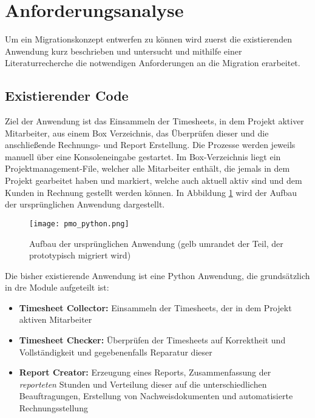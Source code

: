 \section{Anforderungsanalyse}


Um ein Migrationskonzept entwerfen zu können wird zuerst die existierenden Anwendung kurz beschrieben und untersucht und mithilfe einer Literaturrecherche die notwendigen Anforderungen an die Migration erarbeitet.

\subsection{Existierender Code}
Ziel der Anwendung ist das Einsammeln der Timesheets, in dem Projekt aktiver Mitarbeiter, aus einem \gls{Box} Verzeichnis, das Überprüfen dieser und die anschließende Rechnungs- und Report Erstellung. Die Prozesse werden jeweils manuell über eine Konsoleneingabe gestartet. Im \gls{Box}-Verzeichnis liegt ein Projektmanagement-File, welcher alle Mitarbeiter enthält, die jemals in dem Projekt gearbeitet haben und markiert, welche auch aktuell aktiv sind und dem Kunden in Rechnung gestellt werden können. In Abbildung \ref{fig:pmo_python} wird der Aufbau der ursprünglichen Anwendung dargestellt.

\begin{figure}[H]
    \centering
    \texttt{[image: pmo\_python.png]}
    \caption{Aufbau der ursprünglichen Anwendung (gelb umrandet der Teil, der prototypisch migriert wird)}
    \label{fig:pmo_python}
\end{figure}

Die bisher existierende Anwendung ist eine Python Anwendung, die grundsätzlich in dre Module aufgeteilt ist:
\begin{itemize}
\item \textbf{Timesheet Collector: }Einsammeln der Timesheets, der in dem Projekt aktiven Mitarbeiter
\item \textbf{Timesheet Checker: }Überprüfen der Timesheets auf Korrektheit und Vollständigkeit und gegebenenfalls Reparatur dieser
\item \textbf{Report Creator: }Erzeugung eines Reports, Zusammenfassung der \textit{reporteten} Stunden und Verteilung dieser auf die unterschiedlichen Beauftragungen, Erstellung von Nachweisdokumenten und automatisierte Rechnungsstellung
\end{itemize}

